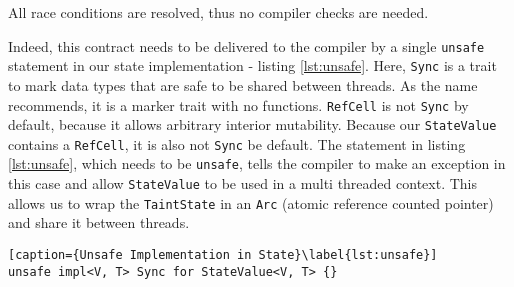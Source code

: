 All race conditions are resolved, thus no compiler checks are needed.

Indeed, this contract needs to be delivered to the compiler by a single \texttt{unsafe} statement in
our state implementation - listing \ref{lst:unsafe}. Here, \texttt{Sync} is a trait to mark data
types that are safe to be shared between threads. As the name recommends, it is a marker trait with
no functions. \texttt{RefCell} is not \texttt{Sync} by default, because it allows arbitrary interior
mutability. Because our \texttt{StateValue} contains a \texttt{RefCell}, it is also not
\texttt{Sync} be default. The statement in listing \ref{lst:unsafe}, which needs to be \texttt{unsafe}, tells
the compiler to make an exception in this case and allow \texttt{StateValue} to be used in a multi
threaded context. This allows us to wrap the \texttt{TaintState} in an \texttt{Arc} (atomic
reference counted pointer) and share it between threads.

\begin{lstlisting}[caption={Unsafe Implementation in State}\label{lst:unsafe}]
unsafe impl<V, T> Sync for StateValue<V, T> {}
\end{lstlisting}

